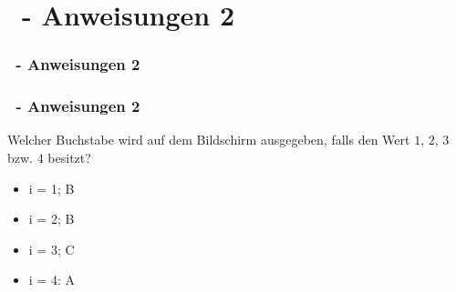 \def\stitle{\theexercise\ - Anweisungen 2}
\section{\stitle}
\begin{frame}
    \frametitle{\stitle}
\tableofcontents[current]    
\end{frame}

\begin{frame}[t]%
    \frametitle{\stitle}
    
Welcher Buchstabe wird auf dem Bildschirm ausgegeben, falls  den Wert $1$, $2$, $3$ bzw. $4$ besitzt?

\pause

\begin{center}
\begin{minipage}{0.4\textwidth}
\begin{itemize}
\item i = 1; B
\item i = 2; B
\end{itemize}
\end{minipage}
\begin{minipage}{0.5\textwidth}
\begin{itemize}
\item i = 3; C
\item i = 4: A
\end{itemize}
\end{minipage}
\end{center}


\end{frame}